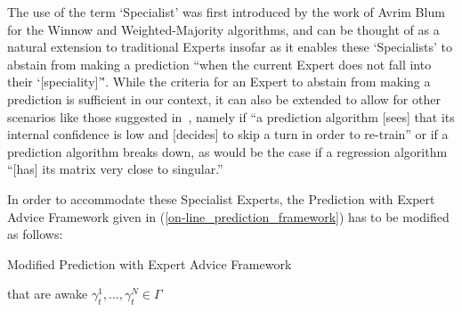 The use of the term `Specialist' was first introduced by the work of Avrim Blum~\cite{blum:1997} for the Winnow and Weighted-Majority algorithms, and can be thought of as a natural extension to traditional Experts insofar as it enables these `Specialists' to abstain from making a prediction ``when the current Expert does not fall into their `[speciality]'\''. While the criteria for an Expert to abstain from making a prediction is sufficient in our context, it can also be extended to allow for other scenarios like those suggested in~\cite{kalnishkan:2022}, namely if ``a prediction algorithm [sees] that its internal confidence is low and [decides] to skip a turn in order to re-train'' or if a prediction algorithm breaks down, as would be the case if a regression algorithm ``[has] its matrix very close to singular.''

In order to accommodate these Specialist Experts, the Prediction with Expert Advice Framework given in (\ref{on-line_prediction_framework}) has to be modified as follows:
\begin{protocol}[H]
    \caption{Modified Prediction with Expert Advice Framework}\label{protocol:modified_prediction_with_expert_advice}
    \begin{algorithmic}[1]
         that are awake
        $\gamma^1_t, \ldots, \gamma^N_t \in \Gamma$
    \end{algorithmic}
\end{protocol}

